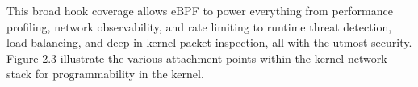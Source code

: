 \documentclass [11pt, proquest] {uwthesis}[2020/02/24]
\begin{document}
This broad hook coverage allows eBPF to power everything from performance profiling, network observability, and rate limiting to runtime threat detection, load balancing, and deep in-kernel packet inspection, all with the utmost security. \hyperref[sec:ebpf-hooks-kernel-network-datapath]{Figure 2.3} illustrate the various attachment points within the kernel network stack for programmability in the kernel.


\end{document}
